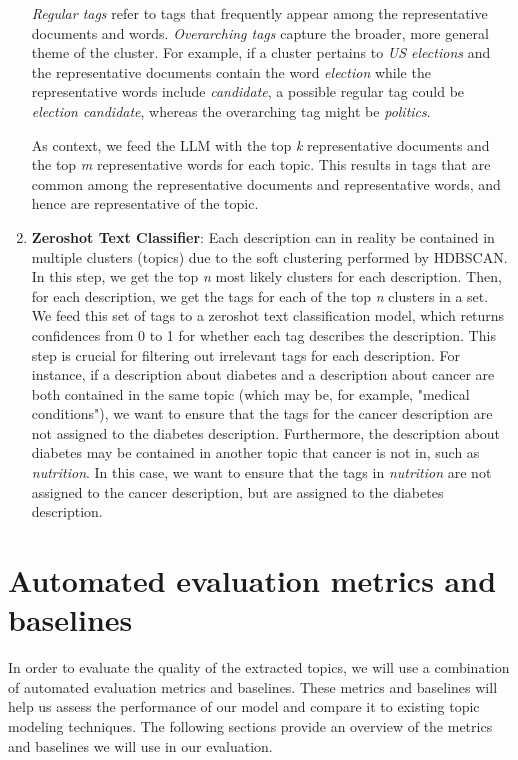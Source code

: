 \begin{enumerate}
    \textit{Regular tags} refer to tags that frequently appear among the representative documents and words. \textit{Overarching tags} capture the broader, more general theme of the cluster. For example, if a cluster pertains to \textit{US elections} and the representative documents contain the word \textit{election} while the representative words include \textit{candidate}, a possible regular tag could be \textit{election candidate}, whereas the overarching tag might be \textit{politics}.

    As context, we feed the LLM with the top \textit{k} representative documents and the top \textit{m} representative words for each topic. This results in tags that are common among the representative documents and representative words, and hence are representative of the topic.
    \item \textbf{Zeroshot Text Classifier}: Each description can in reality be contained in multiple clusters (topics) due to the soft clustering performed by HDBSCAN. In this step, we get the top \textit{n} most likely clusters for each description. Then, for each description, we get the tags for each of the top \textit{n} clusters in a set. We feed this set of tags to a zeroshot text classification model, which returns confidences from 0 to 1 for whether each tag describes the description. This step is crucial for filtering out irrelevant tags for each description. For instance, if a description about diabetes and a description about cancer are both contained in the same topic (which may be, for example, "medical conditions"), we want to ensure that the tags for the cancer description are not assigned to the diabetes description. Furthermore, the description about diabetes may be contained in another topic that cancer is not in, such as \textit{nutrition}. In this case, we want to ensure that the tags in \textit{nutrition} are not assigned to the cancer description, but are assigned to the diabetes description.

\end{enumerate}


\section{Automated evaluation metrics and baselines}
\label{sec:automated_evaluation}
In order to evaluate the quality of the extracted topics, we will use a combination of automated evaluation metrics and baselines. These metrics and baselines will help us assess the performance of our model and compare it to existing topic modeling techniques. The following sections provide an overview of the metrics and baselines we will use in our evaluation.

